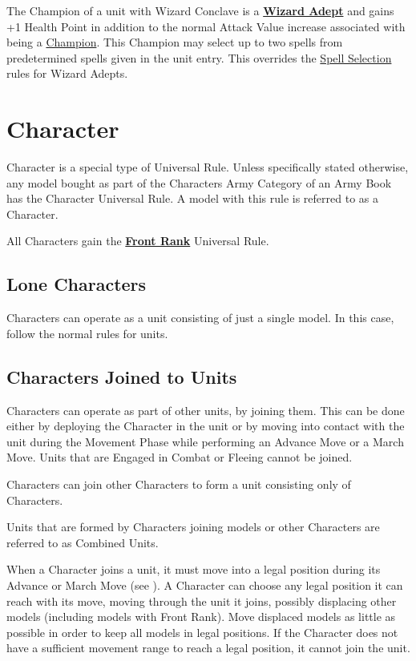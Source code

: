The Champion of a unit with Wizard Conclave is a \hyperref[wizard_adept]{\textbf{Wizard Adept}} and gains +1 Health Point in addition to the normal Attack Value increase associated with being a \hyperref[champion]{Champion}. This Champion may select up to two spells from predetermined spells given in the unit entry. This overrides the \hyperref[spell_selection]{Spell Selection} rules for Wizard Adepts.

\section{Character}
\label{characters}

Character is a special type of Universal Rule. Unless specifically stated otherwise, any model bought as part of the Characters Army Category of an Army Book has the Character Universal Rule. A model with this rule is referred to as a Character.

All Characters gain the \hyperref[front_rank]{\textbf{Front Rank}} Universal Rule.

\subsection{Lone Characters}

Characters can operate as a unit consisting of just a single model. In this case, follow the normal rules for units.

\subsection{Characters Joined to Units}

Characters can operate as part of other units, by joining them. This can be done either by deploying the Character in the unit or by moving into contact with the unit during the Movement Phase while performing an Advance Move or a March Move. Units that are Engaged in Combat or Fleeing cannot be joined.

Characters can join other Characters to form a unit consisting only of Characters.

Units that are formed by Characters joining \rnf{} models or other Characters are referred to as Combined Units.

When a Character joins a unit, it must move into a legal position during its Advance or March Move (see ). A Character can choose any legal position it can reach with its move, moving through the unit it joins, possibly displacing other models (including models with Front Rank). Move displaced models as little as possible in order to keep all models in legal positions. If the Character does not have a sufficient movement range to reach a legal position, it cannot join the unit.

